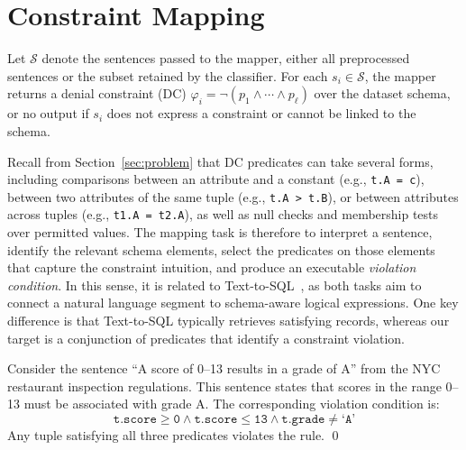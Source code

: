\section{Constraint Mapping}
\label{sec:mapper}

Let $\mathcal{S}$ denote the sentences passed to the mapper, either all preprocessed sentences or the subset retained by the classifier. For each $s_i \in \mathcal{S}$, the mapper returns a denial constraint (DC) $\varphi_i = \neg(p_1 \land \cdots \land p_\ell)$ over the dataset schema, or no output if $s_i$ does not express a constraint or cannot be linked to the schema.

Recall from Section~\ref{sec:problem} that DC predicates can take several forms, including comparisons between an attribute and a constant (e.g., \texttt{t.A = c}), between two attributes of the same tuple (e.g., \texttt{t.A > t.B}), or between attributes across tuples (e.g., \texttt{t1.A = t2.A}), as well as null checks and membership tests over permitted values.
The mapping task is therefore to interpret a sentence, identify the relevant schema elements, select the predicates on those elements that capture the constraint intuition, and produce an executable \emph{violation condition}. In this sense, it is related to Text-to-SQL~\cite{yu2018spider}, as both tasks aim to connect a natural language segment to schema-aware logical expressions. One key difference is that Text-to-SQL typically retrieves satisfying records, whereas our target is a conjunction of predicates that identify a constraint violation.

\begin{example}
\label{ex:mapping}
Consider the sentence ``A score of 0--13 results in a grade of A'' from the NYC restaurant inspection regulations. This sentence states that scores in the range 0--13 must be associated with grade A. The corresponding violation condition is:
\[
\texttt{t.score} \geq \texttt{0} \land \texttt{t.score} \leq \texttt{13} \land \texttt{t.grade} \neq \texttt{`A'}
\]
Any tuple satisfying all three predicates violates the rule. \qed
\end{example}

